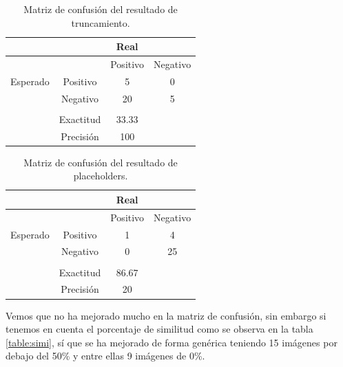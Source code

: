 \begin{table}[H]
	\centering
	\begin{tabular}{|c|c|c|c|}
		\hline
		& & Real &   \\
		\hline
		&          & Positivo & Negativo                   \\
		\hline
		Esperado & Positivo & 5& 0 \\
		\hline
		& Negativo & 		  20& 5                \\
		\hline
		 						&&&\\
		\hline
		&Exactitud& 33.33 & \\
		\hline
		&Precisión& 100 &\\
		\hline
	\end{tabular}
	\caption{Matriz de confusión del resultado de truncamiento.}
\label{table:mt_pos_trun}
\end{table}
\begin{table}[H]
	\centering
	\begin{tabular}{|c|c|c|c|}
		\hline
		& & Real &   \\
		\hline
		&          & Positivo & Negativo                   \\
		\hline
		Esperado & Positivo & 1& 4 \\
		\hline
		& Negativo & 		  0& 25                \\
		\hline
		 						&&&\\
		\hline
		&Exactitud& 86.67 & \\
		\hline
		&Precisión& 20 &\\
		\hline
	\end{tabular}
	\caption{Matriz de confusión del resultado de placeholders.}
\label{table:mt_pos_place}
\end{table}
Vemos que no ha mejorado mucho en la matriz de confusión, sin embargo si tenemos en cuenta el porcentaje de similitud como se observa en la tabla \ref{table:simi}, sí que se ha mejorado de forma genérica teniendo 15 imágenes por debajo del 50\% y entre ellas 9 imágenes de 0\%.

